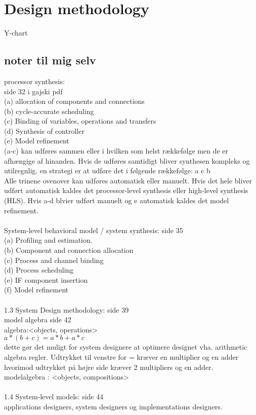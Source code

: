 \chapter{Design methodology} \label{ch:designmet}
Y-chart
\cite{gajski2009}

\color{gray}
\section*{noter til mig selv}
processor synthesis:\\
side 32 i gajski pdf \\
(a) allocation of components and connections \\
(b) cycle-accurate scheduling\\
(c) Binding of variables, operations and transfers\\
(d) Synthesis of controller\\
(e) Model refinement\\
(a-c) kan udføres sammen eller i hvilken som helst rækkefølge men de er afhængige af hinanden. Hvis de udføres samtidigt bliver synthesen kompleks og utilregnlig. en strategi er at udføre det i følgende rækkefølge: a c b\\
Alle trinene ovenover kan udføres automatisk eller manuelt. Hvis det hele bliver udført automatisk kaldes det processor-level synthesis eller high-level synthesis (HLS).  Hvis a-d blvier udført manuelt og e automatisk kaldes det model refinement.\\
\\
System-level behavioral model / system synthesis: side 35\\
(a) Profiling and estimation. \\
(b) Component and connection allocation\\
(c) Process and channel binding\\
(d) Process scheduling\\
(e) IF component insertion\\
(f) Model refinement\\
\\
1.3 System Design methodology: side 39 \\
model algebra side 42\\
algebra:<objects, operations>\\
$a*(b+c) = a*b+a*c$\\
dette gør det muligt for system designere at optimere designet vha. arithmetic algebra regler. Udtrykket til venstre for = kræver en multiplier og en adder hvorimod udtrykket på højre side kræver 2 multipliers og en adder.\\
modelalgebra : <objects, compositions>\\
\\
1.4 System-level models: side 44\\
applications designers, system designers og implementations designers.



